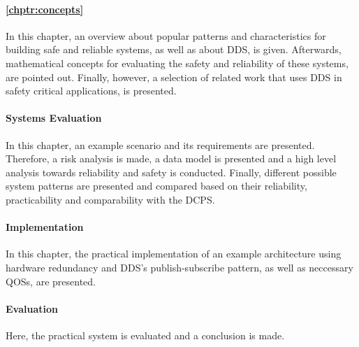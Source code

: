 \paragraph{\autoref{chptr:concepts}}
In this chapter, an overview about popular patterns and characteristics for building safe and reliable systems, as well as about \gls*{DDS}, is given.
Afterwards, mathematical concepts for evaluating the safety and reliability of these systems, are pointed out.
Finally, however, a selection of related work that uses \gls{DDS} in safety critical applications, is presented.

\paragraph{Systems Evaluation}
In this chapter, an example scenario and its requirements are presented.
Therefore, a risk analysis is made, a data model is presented and a high level analysis towards reliability and safety is conducted.
Finally, different possible system patterns are presented and compared based on their reliability, practicability and comparability with the \gls*{DCPS}.

\paragraph{Implementation}
In this chapter, the practical implementation of an example architecture using hardware redundancy and \gls*{DDS}'s publish-subscribe pattern, as well as neccessary \glspl*{QOS}, are presented.

\paragraph{Evaluation}
Here, the practical system is evaluated and a conclusion is made.
